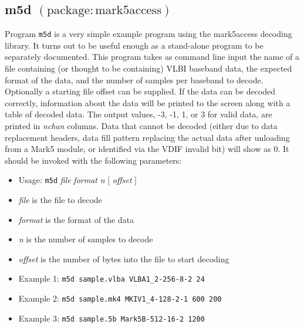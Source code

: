 











\subsection{m5d {\small $\mathrm{(package: mark5access)}$}} \label{sec:m5d}

Program {\tt m5d} is a very simple example program using the mark5access decoding library.
It turns out to be useful enough as a stand-alone program to be separately documented.
This program takes as command line input the name of a file containing (or thought to be containing) VLBI baseband data, the expected format of the data, and the number of samples per baseband to decode.
Optionally a starting file offset can be supplied.
If the data can be decoded correctly, information about the data will be printed to the screen along with a table of decoded data.
The output values, -3, -1, 1, or 3 for valid data, are printed in {\em nchan} columns.
Data that cannot be decoded (either due to data replacement headers, data fill pattern replacing the actual data after unloading from a Mark5 module, or identified via the VDIF invalid bit) will show as 0.
It should be invoked with the following parameters:

\begin{itemize}
\item[] Usage: {\tt m5d} {\em file} {\em format} {\em n} $[$ {\em offset} $]$ 
\item[] {\em file} is the file to decode
\item[] {\em format} is the format of the data
\item[] {\em n} is the number of samples to decode
\item[] {\em offset} is the number of bytes into the file to start decoding
\item[] Example 1: {\tt m5d sample.vlba VLBA1\_2-256-8-2 24}
\item[] Example 2: {\tt m5d sample.mk4 MKIV1\_4-128-2-1 600 200} 
\item[] Example 3: {\tt m5d sample.5b Mark5B-512-16-2 1200}
\end{itemize}

